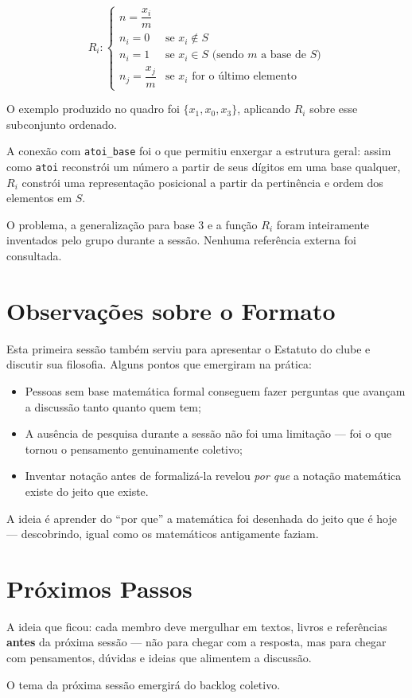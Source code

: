 \documentclass[12pt, a4paper]{article}
\begin{document}
$$
R_i: \begin{cases}
  n = \dfrac{x_i}{m} \\[6pt]
  n_i = 0 & \text{se } x_i \notin S \\[4pt]
  n_i = 1 & \text{se } x_i \in S \text{ (sendo } m \text{ a base de } S\text{)} \\[4pt]
  n_j = \dfrac{x_j}{m} & \text{se } x_i \text{ for o último elemento}
\end{cases}
$$

O exemplo produzido no quadro foi $\{x_1, x_0, x_3\}$, aplicando $R_i$ sobre esse subconjunto ordenado.

A conexão com \texttt{atoi\_base} foi o que permitiu enxergar a estrutura geral: assim como \texttt{atoi} reconstrói um número a partir de seus dígitos em uma base qualquer, $R_i$ constrói uma representação posicional a partir da pertinência e ordem dos elementos em $S$.

\begin{infobox}
  O problema, a generalização para base 3 e a função $R_i$ foram inteiramente inventados pelo grupo durante a sessão. Nenhuma referência externa foi consultada.
\end{infobox}

\section{Observações sobre o Formato}

Esta primeira sessão também serviu para apresentar o Estatuto do clube e discutir sua filosofia. Alguns pontos que emergiram na prática:

\begin{itemize}
  \item Pessoas sem base matemática formal conseguem fazer perguntas que avançam a discussão tanto quanto quem tem;
  \item A ausência de pesquisa durante a sessão não foi uma limitação --- foi o que tornou o pensamento genuinamente coletivo;
  \item Inventar notação antes de formalizá-la revelou \textit{por que} a notação matemática existe do jeito que existe.
\end{itemize}

\begin{citacao}
A ideia é aprender do ``por que'' a matemática foi desenhada do jeito que é hoje --- descobrindo, igual como os matemáticos antigamente faziam.
\end{citacao}

\section{Próximos Passos}

A ideia que ficou: cada membro deve mergulhar em textos, livros e referências \textbf{antes} da próxima sessão --- não para chegar com a resposta, mas para chegar com pensamentos, dúvidas e ideias que alimentem a discussão.

O tema da próxima sessão emergirá do backlog coletivo.
\end{document}
